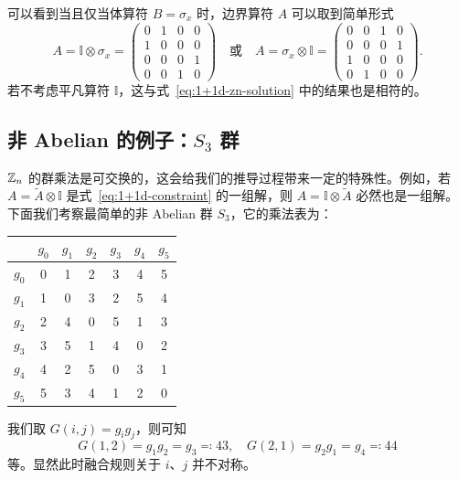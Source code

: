可以看到当且仅当体算符 $B=\sigma_x$ 时，边界算符 $A$ 可以取到简单形式
\begin{equation}
  A = \mathbb{I} \otimes \sigma_x = \begin{pmatrix}
    0 & 1 & 0 & 0 \\
    1 & 0 & 0 & 0 \\
    0 & 0 & 0 & 1 \\
    0 & 0 & 1 & 0
  \end{pmatrix}
  \quad \text{或} \quad
  A = \sigma_x \otimes \mathbb{I} = \begin{pmatrix}
    0 & 0 & 1 & 0 \\
    0 & 0 & 0 & 1 \\
    1 & 0 & 0 & 0 \\
    0 & 1 & 0 & 0
  \end{pmatrix}.
\end{equation}
若不考虑平凡算符 $\mathbb{I}$，这与式~\eqref{eq:1+1d-zn-solution} 中的结果也是相符的。

\subsection{非 Abelian 的例子：\texorpdfstring{$S_3$}{𝑆₃} 群}

$\mathbb{Z}_n$ 的群乘法是可交换的，这会给我们的推导过程带来一定的特殊性。例如，若 $A=\tilde{A}\otimes\mathbb{I}$ 是式~\eqref{eq:1+1d-constraint} 的一组解，则 $A=\mathbb{I}\otimes\tilde{A}$ 必然也是一组解。下面我们考察最简单的非 Abelian 群 $S_3$，它的乘法表为：
\begin{center}
  \begin{tabular}{c|cccccc}
    & $g_0$ & $g_1$ & $g_2$ & $g_3$ & $g_4$ & $g_5$ \\
    \hline
    $g_0$ & 0 & 1 & 2 & 3 & 4 & 5 \\
    $g_1$ & 1 & 0 & 3 & 2 & 5 & 4 \\
    $g_2$ & 2 & 4 & 0 & 5 & 1 & 3 \\
    $g_3$ & 3 & 5 & 1 & 4 & 0 & 2 \\
    $g_4$ & 4 & 2 & 5 & 0 & 3 & 1 \\
    $g_5$ & 5 & 3 & 4 & 1 & 2 & 0
  \end{tabular}
\end{center}
我们取 $G(i,j)=g_i g_j$，则可知
\begin{equation}
  G(1,2) = g_1 g_2 = g_3 \eqcolon4 3, \quad
  G(2,1) = g_2 g_1 = g_4 \eqcolon4 4
\end{equation}
等。显然此时融合规则关于 $i$、$j$ 并不对称。

